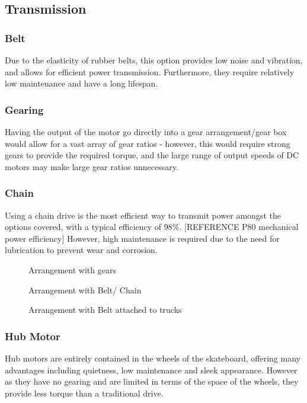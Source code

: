 \documentclass[journal,10pt]{IEEEtran}
\begin{document}
    \subsection{Transmission}
        \subsubsection{Belt}
            Due to the elasticity of rubber belts, this option provides low noise and vibration, and allows for efficient power transmission. Furthermore, they require relatively low maintenance and have a long lifespan. 
        \subsubsection{Gearing}
            Having the output of the motor go directly into a gear arrangement/gear box would allow for a vast array of gear ratios - however, this would require strong gears to provide the required torque, and the large range of output speeds of DC motors may make large gear ratios unnecessary.
        \subsubsection{Chain}
            Using a chain drive is the most efficient way to transmit power amongst the options covered, with a typical efficiency of 98\%. [REFERENCE P80 mechanical power efficiency] However, high maintenance is required due to the need for lubrication to prevent wear and corrosion. 
        \begin{figure}[H]
            \centering
            \caption{Arrangement with gears}
            \label{fig:Drivetrain1}
        \end{figure}
        \begin{figure}[H]
            \centering
            \caption{Arrangement with Belt/ Chain}
            \label{fig:Drivetrain2}
        \end{figure}
        \begin{figure}[H]
            \centering
            \caption{Arrangement with Belt attached to trucks}
            \label{fig:Drivetrain3}
        \end{figure}
        \subsubsection{Hub Motor}
            Hub motors are entirely contained in the wheels of the skateboard, offering many advantages including quietness, low maintenance and sleek appearance.
            However as they have no gearing and are limited in terms of the space of the wheels, they provide less torque than a traditional drive. %
\end{document}
